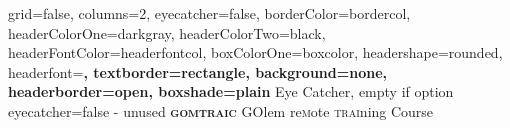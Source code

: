 \documentclass[a4paper,portrait,fontscale=1]{baposter}
\begin{document}


\begin{poster}{
	grid=false,
        columns=2,
	eyecatcher=false, 
	borderColor=bordercol,
	headerColorOne=darkgray,
	headerColorTwo=black,
	headerFontColor=headerfontcol,
	boxColorOne=boxcolor,
	headershape=rounded,
	headerfont=\Large\sf\bf,
	textborder=rectangle,
	background=none,
	headerborder=open,
  boxshade=plain
}
{
	Eye Catcher, empty if option eyecatcher=false - unused
}
{\sf\bf
	 \textsc{gomtraic }
}
{
  \textsc{GO}lem re\textsc{m}ote \textsc{trai}ning \textsc{C}ourse
}
{
}

\end{poster}
\end{document}
